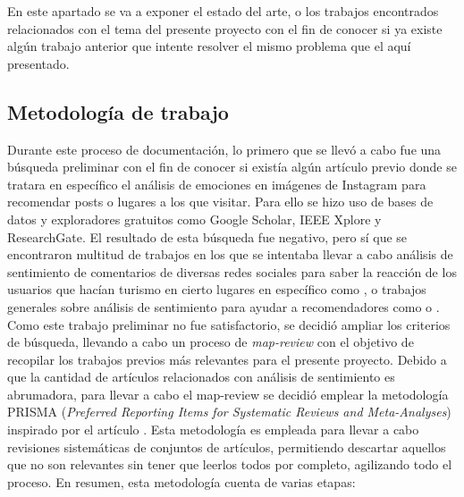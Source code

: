
En este apartado se va a exponer el estado del arte, o los trabajos encontrados relacionados con el tema del presente proyecto con el fin de conocer si ya existe algún trabajo anterior que intente resolver el mismo problema que el aquí presentado.\\

\subsection{Metodología de trabajo}

Durante este proceso de documentación, lo primero que se llevó a cabo fue una búsqueda preliminar con el fin de conocer si existía algún artículo previo donde se tratara en específico el análisis de emociones en imágenes de Instagram para recomendar posts o lugares a los que visitar. Para ello se hizo uso de bases de datos y exploradores gratuitos como Google Scholar, IEEE Xplore y ResearchGate. El resultado de esta búsqueda fue negativo, pero sí que se encontraron multitud de trabajos en los que se intentaba llevar a cabo análisis de sentimiento de comentarios de diversas redes sociales para saber la reacción de los usuarios que hacían turismo en cierto lugares en específico como \cite{8720960}, o trabajos generales sobre análisis de sentimiento para ayudar a recomendadores como \cite{techniques_media_based_recom} o \cite{recom_sys_sen_analysis}.\\

Como este trabajo preliminar no fue satisfactorio, se decidió ampliar los criterios de búsqueda, llevando a cabo un proceso de \textit{map-review} con el objetivo de recopilar los trabajos previos más relevantes para el presente proyecto. Debido a que la cantidad de artículos relacionados con análisis de sentimiento es abrumadora, para llevar a cabo el map-review se decidió emplear la metodología PRISMA (\textit{Preferred Reporting Items for Systematic Reviews and Meta-Analyses}) inspirado por el artículo \cite{recom_metodo_tutor}. Esta metodología es empleada para llevar a cabo revisiones sistemáticas de conjuntos de artículos, permitiendo descartar aquellos que no son relevantes sin tener que leerlos todos por completo, agilizando todo el proceso. En resumen, esta metodología cuenta de varias etapas:

